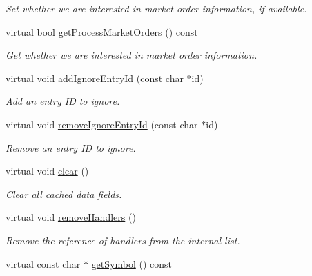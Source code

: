 \begin{CompactItemize}
\begin{CompactList}\small\item\em Set whether we are interested in market order information, if available. \item\end{CompactList}\item 
virtual bool \hyperlink{classWombat_1_1MamdaOrderBookListener_6cbac2b8c695c54cc5cda3006f28fcab}{get\-Process\-Market\-Orders} () const 
\begin{CompactList}\small\item\em Get whether we are interested in market order information. \item\end{CompactList}\item 
virtual void \hyperlink{classWombat_1_1MamdaOrderBookListener_1d3802c30ebd8939435f74a634dc11fc}{add\-Ignore\-Entry\-Id} (const char $\ast$id)
\begin{CompactList}\small\item\em Add an entry ID to ignore. \item\end{CompactList}\item 
virtual void \hyperlink{classWombat_1_1MamdaOrderBookListener_9bd0ec676f02115594f5f29e0f28e3b9}{remove\-Ignore\-Entry\-Id} (const char $\ast$id)
\begin{CompactList}\small\item\em Remove an entry ID to ignore. \item\end{CompactList}\item 
virtual void \hyperlink{classWombat_1_1MamdaOrderBookListener_9dfecc38256b4bbe71ab35c58cc5ef1a}{clear} ()
\begin{CompactList}\small\item\em Clear all cached data fields. \item\end{CompactList}\item 
virtual void \hyperlink{classWombat_1_1MamdaOrderBookListener_ba3e661b148450a0865b07cf169a12b1}{remove\-Handlers} ()
\begin{CompactList}\small\item\em Remove the reference of handlers from the internal list. \item\end{CompactList}\item 
virtual const char $\ast$ \hyperlink{classWombat_1_1MamdaOrderBookListener_11b3e826a2aba8faf699c16454051143}{get\-Symbol} () const 

\end{CompactItemize}
